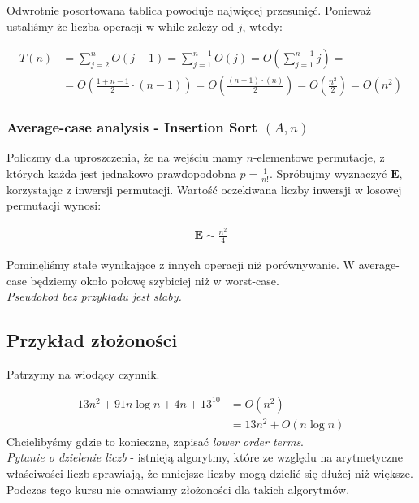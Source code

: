 \documentclass{article}
\numberwithin{equation}{subsection}
\begin{document}
Odwrotnie posortowana tablica powoduje najwięcej przesunięć. Ponieważ ustaliśmy że liczba operacji w while zależy od $j$, wtedy:

\begin{align}
    T(n) &= \sum_{j=2}^n O(j-1) = \sum_{j=1}^{n-1} O(j) = O\left(\sum_{j=1}^{n-1} j\right) =\\
    &= O\left(\frac{1+n-1}{2}\cdot (n-1)\right) = O\left(\frac{(n-1)\cdot(n)}{2}\right) = O\left(\frac{n^2}{2}\right) = O(n^2)
\end{align}

\subsubsection{Average-case analysis - Insertion Sort $(A,n)$}

Policzmy dla uproszczenia, że na wejściu mamy $n$-elementowe permutacje, z których każda jest jednakowo prawdopodobna $p=\frac{1}{n!}$. Spróbujmy wyznaczyć $\mathbf{E}$, korzystając z inwersji permutacji. Wartość oczekiwana liczby inwersji w losowej permutacji wynosi:

\begin{align}
    \mathbf{E} \sim \frac{n^2}{4}
\end{align}

\noindent
Pominęliśmy stałe wynikające z innych operacji niż porównywanie. W average-case będziemy około połowę szybiciej niż w worst-case.\\

\noindent
\textit{Pseudokod bez przykładu jest słaby.}

\subsection{Przykład złożoności}

Patrzymy na wiodący czynnik.

\begin{align}
    13n^2 + 91n\log n + 4n + 13^{10} &= O(n^2)\\
    &= 13n^2 + O(n\log n)
\end{align}
\noindent
Chcielibyśmy gdzie to konieczne, zapisać \textit{lower order terms}.\\

\noindent
\textit{Pytanie o dzielenie liczb} - istnieją algorytmy, które ze względu na arytmetyczne właściwości liczb sprawiają, że mniejsze liczby mogą dzielić się dłużej niż większe. Podczas tego kursu nie omawiamy złożoności dla takich algorytmów.  
\end{document}
